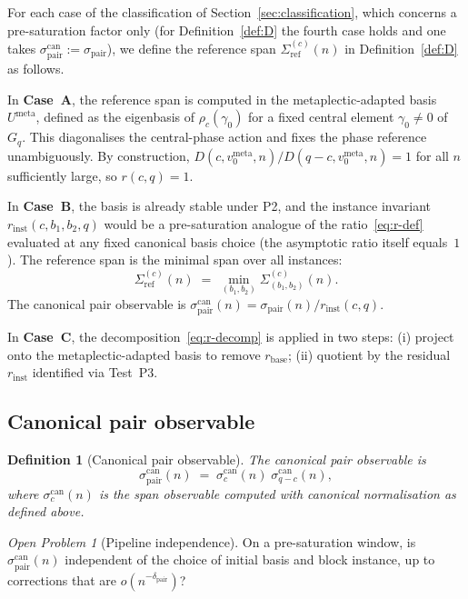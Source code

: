 \documentclass[11pt,a4paper]{article}
\newtheorem{definition}[theorem]{Definition}
\theoremstyle{remark}
\newtheorem{openproblem}[theorem]{Open Problem}
\newcommand{\dpair}{\delta_{\mathrm{pair}}}
\newcommand{\sigmapair}{\sigma_{\mathrm{pair}}}
\newcommand{\sigmacan}{\sigma_{\mathrm{pair}}^{\mathrm{can}}}
\newcommand{\rcq}{r(c,q)}
\begin{document}
    For each case of the classification of Section~\ref{sec:classification}, which concerns a
    pre-saturation factor only (for Definition~\ref{def:D} the fourth case holds and one takes
    $\sigmacan := \sigmapair$), we define the reference span $\Sigma^{(c)}_{\mathrm{ref}}(n)$ in
    Definition~\ref{def:D} as follows.

    In \textbf{Case~A}, the reference span is computed in the metaplectic-adapted
    basis $U^{\mathrm{meta}}$, defined as the eigenbasis of $\rho_{c}(\gamma_{0})$
    for a fixed central element $\gamma_{0} \neq 0$ of $G_{q}$.
    This diagonalises the central-phase action and fixes the phase reference
    unambiguously.
    By construction, $D(c, v_{0}^{\mathrm{meta}}, n) / D(q-c, v_{0}^{\mathrm{meta}}, n) = 1$
    for all $n$ sufficiently large, so $\rcq = 1$.

    In \textbf{Case~B}, the basis is already stable under P2, and the
    instance invariant $r_{\mathrm{inst}}(c, b_{1}, b_{2}, q)$ would be a pre-saturation analogue of
    the ratio~\eqref{eq:r-def} evaluated at any fixed canonical basis choice (the asymptotic ratio
    itself equals~$1$).
    The reference span is the minimal span over all instances:
    \[
      \Sigma^{(c)}_{\mathrm{ref}}(n)
      \;=\;
      \min_{(b_{1},b_{2})} \Sigma^{(c)}_{(b_{1},b_{2})}(n).
    \]
    The canonical pair observable is $\sigmacan(n) = \sigmapair(n) / r_{\mathrm{inst}}(c,q)$.

    In \textbf{Case~C}, the decomposition~\eqref{eq:r-decomp} is applied in two steps:
    (i) project onto the metaplectic-adapted basis to remove $r_{\mathrm{base}}$;
    (ii) quotient by the residual $r_{\mathrm{inst}}$ identified via Test~P3.

  \subsection{Canonical pair observable}

    \begin{definition}[Canonical pair observable]
      \label{def:sigmacan}
      The \emph{canonical pair observable} is
      \[
        \sigmacan(n)
        \;=\;
        \sigma_{c}^{\mathrm{can}}(n)\;\sigma_{q-c}^{\mathrm{can}}(n),
      \]
      where $\sigma_{c}^{\mathrm{can}}(n)$ is the span observable computed with
      canonical normalisation as defined above.
    \end{definition}

    \begin{openproblem}[Pipeline independence]
      \label{prop:independence}
      On a pre-saturation window, is $\sigmacan(n)$ independent of the choice of initial basis and
      block instance, up to corrections that are $o(n^{-\dpair})$?
    \end{openproblem}
\end{document}
